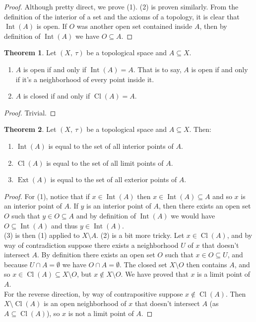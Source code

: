 \documentclass[a4paper]{book}
\theoremstyle{definition}
\newtheorem{theorem}{Theorem}[section]
\theoremstyle{ejemplo}
\theoremstyle{demostracion}
\DeclareMathOperator{\interior}{Int}
\DeclareMathOperator{\exterior}{Ext}
\DeclareMathOperator{\closure}{Cl}
\begin{document}
\begin{proof}
	Although pretty direct, we prove (1). (2) is proven similarly. From the definition of the interior of a set and the axioms of a topology, it is clear that $\interior(A)$ is open. If $O$ was another open set contained inside $A$, then by definition of $\interior(A)$ we have $O \subseteq A$.
\end{proof}

\begin{theorem}
	Let $(X,\ \tau)$ be a topological space and $A \subseteq X$.
	\begin{enumerate}
		\item
		$A$ is open if and only if $\interior(A) = A$. That is to say, $A$ is open if and only if it's a neighborhood of every point inside it.
		\item
		$A$ is closed if and only if $\closure(A) = A$.
	\end{enumerate}
\end{theorem}

\begin{proof}
	Trivial.
\end{proof}

\begin{theorem}
	Let $(X,\ \tau)$ be a topological space and $A \subseteq X$. Then:
	\begin{enumerate}
		\item
		$\interior(A)$ is equal to the set of all interior points of $A$.
		\item
		$\closure(A)$ is equal to the set of all limit points of $A$.
		\item
		$\exterior(A)$ is equal to the set of all exterior points of $A$.
	\end{enumerate}
\end{theorem}

\begin{proof}
	For (1), notice that if $x \in \interior(A)$ then $x \in \interior(A) \subseteq A$ and so $x$ is an interior point of $A$. If $y$ is an interior point of $A$, then there exists an open set $O$ such that $y \in O \subseteq A$ and by definition of $\interior(A)$ we would have $O \subseteq \interior(A)$ and thus $y \in \interior(A)$.\\ 
	(3) is then (1) applied to $X \setminus A$. (2) is a bit more tricky. Let $x \in \closure(A)$, and by way of contradiction suppose there exists a neighborhood $U$ of $x$ that doesn't intersect $A$. By definition there exists an open set $O$ such that $x \in O \subseteq U$, and because $U \cap A = \emptyset$ we have $O \cap A = \emptyset$. The closed set $X \setminus O$ then contains $A$, and so $x \in \closure(A) \subseteq X \setminus O$, but $x \not \in X \setminus O$. We have proved that $x$ is a limit point of $A$.\\ 
	For the reverse direction, by way of contrapositive suppose $x \not \in \closure(A)$. Then $X \setminus \closure(A)$ is an open neighborhood of $x$ that doesn't intersect $A$ (as $A \subseteq \closure(A)$), so $x$ is not a limit point of $A$. 
\end{proof}
\end{document}
